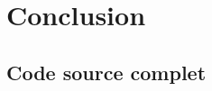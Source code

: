 \documentclass[a4paper,12pt,french]{article}
\begin{document}
\pagebreak
\section{Conclusion}



%
%



\pagebreak
\begin{appendices}
\section{Code source complet}

%
%
%

\end{appendices}
\end{document}
